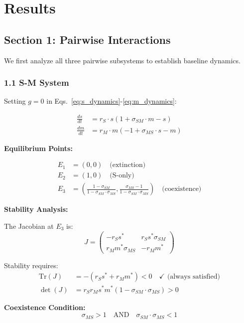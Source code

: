 \documentclass[11pt]{article}
\begin{document}
\section{Results}

\subsection{Section 1: Pairwise Interactions}

We first analyze all three pairwise subsystems to establish baseline dynamics.

\subsubsection{1.1 S-M System}

Setting $g = 0$ in Eqs.~\ref{eq:s_dynamics}-\ref{eq:m_dynamics}:

\begin{align}
\frac{ds}{dt} &= r_S \cdot s(1 + \sigma_{SM} \cdot m - s)\\
\frac{dm}{dt} &= r_M \cdot m(-1 + \sigma_{MS} \cdot s - m)
\end{align}

\textbf{Equilibrium Points:}

\begin{align}
E_1 &= (0, 0) \quad \text{(extinction)}\\
E_2 &= (1, 0) \quad \text{(S-only)}\\
E_3 &= \left(\frac{1-\sigma_{SM}}{1-\sigma_{SM}\cdot\sigma_{MS}}, \frac{\sigma_{MS}-1}{1-\sigma_{SM}\cdot\sigma_{MS}}\right) \quad \text{(coexistence)}
\end{align}

\textbf{Stability Analysis:}

The Jacobian at $E_3$ is:
\begin{equation}
J = \begin{pmatrix}
-r_S s^* & r_S s^* \sigma_{SM}\\
r_M m^* \sigma_{MS} & -r_M m^*
\end{pmatrix}
\end{equation}

Stability requires:
\begin{align}
\text{Tr}(J) &= -(r_S s^* + r_M m^*) < 0 \quad \checkmark \text{ (always satisfied)}\\
\det(J) &= r_S r_M s^* m^* (1 - \sigma_{SM}\cdot\sigma_{MS}) > 0
\end{align}

\textbf{Coexistence Condition:}
\begin{equation}
\boxed{\sigma_{MS} > 1 \quad \text{AND} \quad \sigma_{SM}\cdot\sigma_{MS} < 1}
\end{equation}
\end{document}
